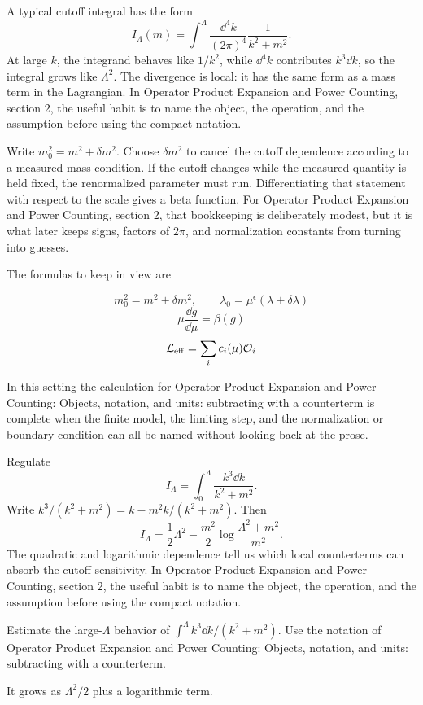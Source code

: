 A typical cutoff integral has the form
\[
  I_\Lambda(m)=\int^{\Lambda}\frac{\dd^4k}{(2\pi)^4}\frac{1}{k^2+m^2}.
\]
At large \(k\), the integrand behaves like \(1/k^2\), while \(\dd^4k\) contributes \(k^3\dd k\), so the integral grows like \(\Lambda^2\).  The divergence is local: it has the same form as a mass term in the Lagrangian.  In Operator Product Expansion and Power Counting, section 2, the useful habit is to name the object, the operation, and the assumption before using the compact notation.

Write \(m_0^2=m^2+\delta m^2\).  Choose \(\delta m^2\) to cancel the cutoff dependence according to a measured mass condition.  If the cutoff changes while the measured quantity is held fixed, the renormalized parameter must run.  Differentiating that statement with respect to the scale gives a beta function.  For Operator Product Expansion and Power Counting, section 2, that bookkeeping is deliberately modest, but it is what later keeps signs, factors of \(2\pi\), and normalization constants from turning into guesses.

The formulas to keep in view are

\[
  m_0^2=m^2+\delta m^2,\qquad \lambda_0=\mu^\epsilon(\lambda+\delta\lambda)
\]
\[
  \mu\frac{\dd g}{\dd\mu}=\beta(g)
\]
\[
  \mathcal L_{\mathrm{eff}}=\sum_i c_i(\mu)\mathcal O_i
\]

In this setting the calculation for Operator Product Expansion and Power Counting: Objects, notation, and units: subtracting with a counterterm is complete when the finite model, the limiting step, and the normalization or boundary condition can all be named without looking back at the prose.




\begin{example}
Regulate
\[
  I_\Lambda=\int_0^\Lambda\frac{k^3\dd k}{k^2+m^2}.
\]
Write \(k^3/(k^2+m^2)=k-m^2k/(k^2+m^2)\).  Then
\[
  I_\Lambda=\frac12\Lambda^2-\frac{m^2}{2}\log\frac{\Lambda^2+m^2}{m^2}.
\]
The quadratic and logarithmic dependence tell us which local counterterms can absorb the cutoff sensitivity.  In Operator Product Expansion and Power Counting, section 2, the useful habit is to name the object, the operation, and the assumption before using the compact notation.
\end{example}



\begin{exercise}
Estimate the large-\(\Lambda\) behavior of \(\int^\Lambda k^3\dd k/(k^2+m^2)\).  Use the notation of Operator Product Expansion and Power Counting: Objects, notation, and units: subtracting with a counterterm.
\begin{answer}
It grows as \(\Lambda^2/2\) plus a logarithmic term.
\end{answer}
\end{exercise}


